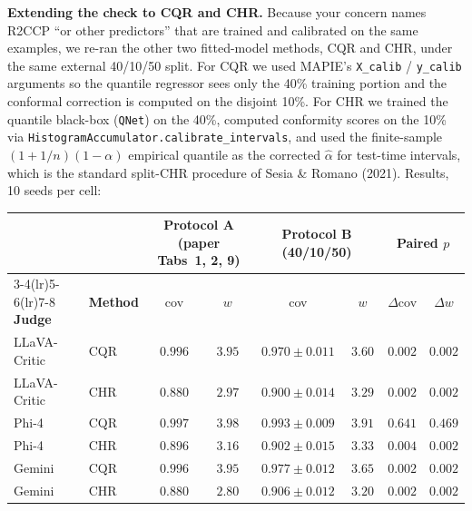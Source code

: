 \documentclass[11pt]{article}
\begin{document}
\textbf{Extending the check to CQR and CHR.} Because your concern names R2CCP ``or other predictors'' that are trained and calibrated on the same examples, we re-ran the other two fitted-model methods, CQR and CHR, under the same external 40/10/50 split. For CQR we used MAPIE's \texttt{X\_calib} / \texttt{y\_calib} arguments so the quantile regressor sees only the 40\% training portion and the conformal correction is computed on the disjoint 10\%. For CHR we trained the quantile black-box (\texttt{QNet}) on the 40\%, computed conformity scores on the 10\% via \texttt{HistogramAccumulator.}\allowbreak\texttt{calibrate\_intervals}, and used the finite-sample $(1+1/n)(1-\alpha)$ empirical quantile as the corrected $\hat{\alpha}$ for test-time intervals, which is the standard split-CHR procedure of Sesia \& Romano (2021). Results, 10 seeds per cell:

\begin{center}
\footnotesize
\setlength{\tabcolsep}{4pt}
\begin{tabular}{ll cc cc cc}
\toprule
 & & \multicolumn{2}{c}{\textbf{Protocol A (paper Tabs~1, 2, 9)}} & \multicolumn{2}{c}{\textbf{Protocol B (40/10/50)}} & \multicolumn{2}{c}{\textbf{Paired $p$}} \\
\cmidrule(lr){3-4}\cmidrule(lr){5-6}\cmidrule(lr){7-8}
\textbf{Judge} & \textbf{Method} & cov & $w$ & cov & $w$ & $\Delta$cov & $\Delta w$ \\
\midrule
LLaVA-Critic & CQR & $0.996$ & $3.95$ & $0.970 \pm 0.011$ & $3.60$ & $0.002$ & $0.002$ \\
LLaVA-Critic & CHR & $0.880$ & $2.97$ & $\mathbf{0.900 \pm 0.014}$ & $3.29$ & $0.002$ & $0.002$ \\
Phi-4        & CQR & $0.997$ & $3.98$ & $0.993 \pm 0.009$ & $3.91$ & $0.641$ & $0.469$ \\
Phi-4        & CHR & $0.896$ & $3.16$ & $\mathbf{0.902 \pm 0.015}$ & $3.33$ & $0.004$ & $0.002$ \\
Gemini       & CQR & $0.996$ & $3.95$ & $0.977 \pm 0.012$ & $3.65$ & $0.002$ & $0.002$ \\
Gemini       & CHR & $0.880$ & $2.80$ & $\mathbf{0.906 \pm 0.012}$ & $3.20$ & $0.002$ & $0.002$ \\
\bottomrule
\end{tabular}
\end{center}
\end{document}
